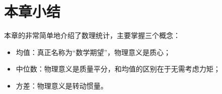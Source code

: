 \section{本章小结}

本章的非常简单地介绍了数理统计，主要掌握三个概念：

\begin{itemize}
    \item 均值：真正名称为“数学期望”，物理意义是质心；
    \item 中位数：物理意义是质量平分，和均值的区别在于无需考虑力矩；
    \item 方差：物理意义是转动惯量。
\end{itemize}




